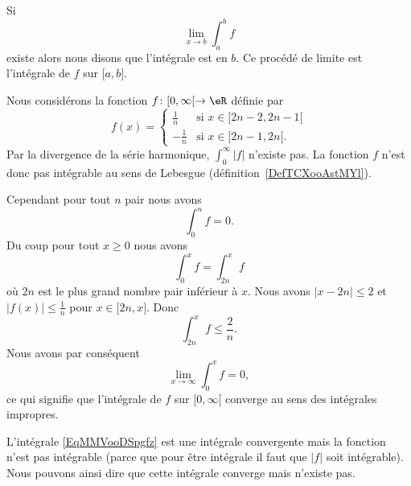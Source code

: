 \begin{definition}      \label{DEFooINPOooWWObEz}
	Si
	\begin{equation}
		\lim_{x\to b} \int_a^bf
	\end{equation}
	existe alors nous disons que l'intégrale est  en \( b\). Ce procédé de limite est l'intégrale  de \( f\) sur \( \mathopen[ a , b \mathclose]\).
\end{definition}

\begin{example}
	Nous considérons la fonction \( f\colon \mathopen[ 0 , \infty [\to \eR\) définie par
	\begin{equation}
		f(x)=\begin{cases}
			\frac{1}{ n }  & \text{si } x\in\mathopen[ 2n-2 , 2n-1 [       \\
			-\frac{1}{ n } & \text{si } x\in\mathopen[ 2n-1 , 2n [\text{.}
		\end{cases}
	\end{equation}
	Par la divergence de la série harmonique, \( \int_{0}^{\infty}| f |\) n'existe pas. La fonction \( f\) n'est donc pas intégrable au sens de Lebesgue (définition~\ref{DefTCXooAstMYl}).

	Cependant pour tout \( n\) pair nous avons
	\begin{equation}
		\int_0^nf=0.
	\end{equation}
	Du coup pour tout \( x\geq 0\) nous avons
	\begin{equation}
		\int_0^xf=\int_{2n}^xf
	\end{equation}
	où \( 2n\) est le plus grand nombre pair inférieur à \( x\). Nous avons \( | x-2n |\leq 2\) et \( | f(x) |\leq \frac{1}{ n }\) pour \( x\in\mathopen[ 2n , x \mathclose]\). Donc
	\begin{equation}
		\int_{2n}^xf\leq \frac{ 2 }{ n }.
	\end{equation}
	Nous avons par conséquent
	\begin{equation}
		\lim_{x\to \infty} \int_0^xf=0,
	\end{equation}
	ce qui signifie que l'intégrale de \( f\) sur \( \mathopen[ 0 , \infty [\) converge au sens des intégrales impropres.
\end{example}


L'intégrale \eqref{EqMMVooDSpgfz} est une intégrale convergente mais la fonction n'est pas intégrable (parce que pour être intégrale il faut que \( | f |\) soit intégrable). Nous pouvons ainsi dire que cette intégrale converge mais n'existe pas.

